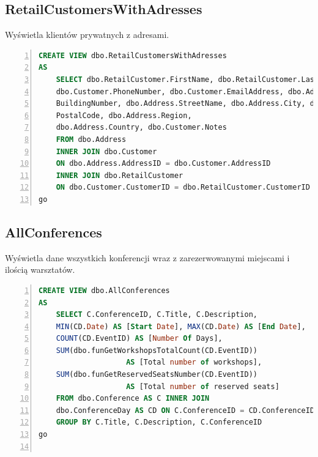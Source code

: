 \documentclass[]{article}
\begin{document}
	\subsection{RetailCustomersWithAdresses}
	Wyświetla klientów prywatnych z adresami.
	\begin{lstlisting}[language=SQL,
						showspaces=false,
						basicstyle=\ttfamily,
						numbers=left,
						numberstyle=\tiny,
						backgroundcolor=\color{lightg},
						keywordstyle=\color{lightblue},
						commentstyle=\color{gray}]
CREATE VIEW dbo.RetailCustomersWithAdresses
AS
	SELECT dbo.RetailCustomer.FirstName, dbo.RetailCustomer.LastName,
	dbo.Customer.PhoneNumber, dbo.Customer.EmailAddress, dbo.Address.
	BuildingNumber, dbo.Address.StreetName, dbo.Address.City, dbo.Address.
	PostalCode, dbo.Address.Region,
	dbo.Address.Country, dbo.Customer.Notes
	FROM dbo.Address
	INNER JOIN dbo.Customer
	ON dbo.Address.AddressID = dbo.Customer.AddressID
	INNER JOIN dbo.RetailCustomer
	ON dbo.Customer.CustomerID = dbo.RetailCustomer.CustomerID
go
	\end{lstlisting}
	
	\subsection{AllConferences}
	Wyświetla dane wszystkich konferencji wraz z zarezerwowanymi miejscami i ilością warsztatów.
	\begin{lstlisting}[language=SQL,
						showspaces=false,
						basicstyle=\ttfamily,
						numbers=left,
						numberstyle=\tiny,
						backgroundcolor=\color{lightg},
						keywordstyle=\color{lightblue},
						commentstyle=\color{gray}]
CREATE VIEW dbo.AllConferences
AS
	SELECT C.ConferenceID, C.Title, C.Description,
	MIN(CD.Date) AS [Start Date], MAX(CD.Date) AS [End Date],
	COUNT(CD.EventID) AS [Number Of Days],
	SUM(dbo.funGetWorkshopsTotalCount(CD.EventID))
					AS [Total number of workshops], 
	SUM(dbo.funGetReservedSeatsNumber(CD.EventID))
					AS [Total number of reserved seats]
	FROM dbo.Conference AS C INNER JOIN
	dbo.ConferenceDay AS CD ON C.ConferenceID = CD.ConferenceID
	GROUP BY C.Title, C.Description, C.ConferenceID
go
	
	\end{lstlisting}
\end{document}
